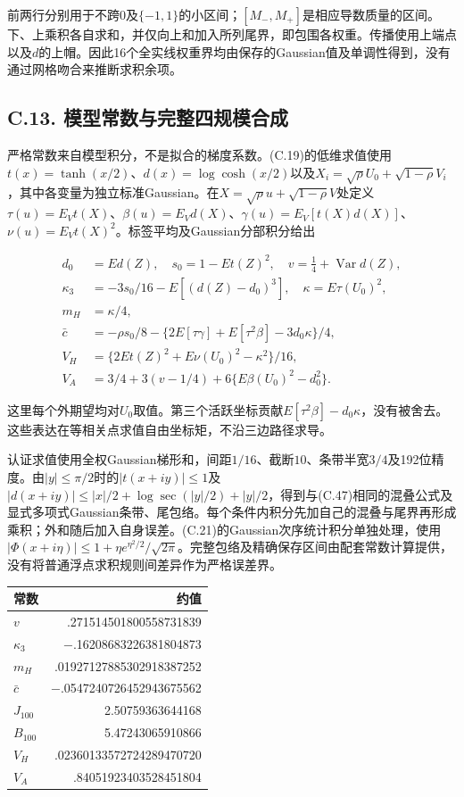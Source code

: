 \documentclass[11pt,a4paper]{article}
\begin{document}
前两行分别用于不跨\(0\)及\(\{-1,1\}\)的小区间；\([M_-,M_+]\)是相应导数质量的区间。下、上乘积各自求和，并仅向上和加入所列尾界，即包围各权重。传播使用上端点以及\(d\)的上帽。因此16个全实线权重界均由保存的Gaussian值及单调性得到，没有通过网格吻合来推断求积余项。

\subsection*{C.13.
模型常数与完整四规模合成}\label{c.13.-ux6a21ux578bux5e38ux6570ux4e0eux5b8cux6574ux56dbux89c4ux6a21ux5408ux6210}

严格常数来自模型积分，不是拟合的梯度系数。(C.19)的低维求值使用\(t(x)=\tanh(x/2)\)、\(d(x)=\log\cosh(x/2)\)以及\(X_i=\sqrt\rho U_0+\sqrt{1-\rho}V_i\)，其中各变量为独立标准Gaussian。在\(X=\sqrt\rho u+\sqrt{1-\rho}V\)处定义\(\tau(u)=E_Vt(X)\)、\(\beta(u)=E_Vd(X)\)、\(\gamma(u)=E_V[t(X)d(X)]\)、\(\nu(u)=E_Vt(X)^2\)。标签平均及Gaussian分部积分给出

\[
\begin{aligned}
d_0&=Ed(Z),\quad s_0=1-Et(Z)^2,\quad v=\tfrac14+\operatorname{Var}d(Z),\\
\kappa_3&=-3s_0/16-E[(d(Z)-d_0)^3],\quad \kappa=E\tau(U_0)^2,\\
m_H&=\kappa/4,\\
\bar c&=-\rho s_0/8-\{2E[\tau\gamma]+E[\tau^2\beta]-3d_0\kappa\}/4,\\
V_H&=\{2Et(Z)^2+E\nu(U_0)^2-\kappa^2\}/16,\\
V_A&=3/4+3(v-1/4)+6\{E\beta(U_0)^2-d_0^2\}.
\end{aligned}
\tag{C.56}
\]

这里每个外期望均对\(U_0\)取值。第三个活跃坐标贡献\(E[\tau^2\beta]-d_0\kappa\)，没有被舍去。这些表达在等相关点求值自由坐标矩，不沿三边路径求导。

认证求值使用全权Gaussian梯形和，间距\(1/16\)、截断\(10\)、条带半宽\(3/4\)及192位精度。由\(|y|\le\pi/2\)时的\(|t(x+iy)|\le1\)及\(|d(x+iy)|\le|x|/2+\log\sec(|y|/2)+|y|/2\)，得到与(C.47)相同的混叠公式及显式多项式Gaussian条带、尾包络。每个条件内积分先加自己的混叠与尾界再形成乘积；外和随后加入自身误差。(C.21)的Gaussian次序统计积分单独处理，使用\(|\Phi(x+i\eta)|\le1+\eta e^{\eta^2/2}/\sqrt{2\pi}\)。完整包络及精确保存区间由配套常数计算提供，没有将普通浮点求积规则间差异作为严格误差界。

\begin{longtable}[]{@{}lr@{}}
\toprule\noalign{}
常数 & 约值 \\
\midrule\noalign{}
\endhead
\bottomrule\noalign{}
\endlastfoot
\(v\) & .271514501800558731839 \\
\(\kappa_3\) & −.16208683226381804873 \\
\(m_H\) & .01927127885302918387252 \\
\(\bar c\) & −.0547240726452943675562 \\
\(J_{100}\) & 2.50759363644168 \\
\(B_{100}\) & 5.47243065910866 \\
\(V_H\) & .02360133572724289470720 \\
\(V_A\) & .84051923403528451804 \\
\end{longtable}
\end{document}

